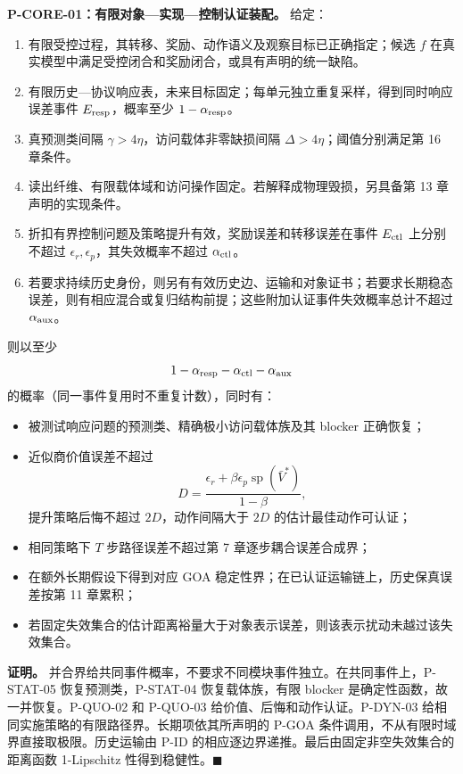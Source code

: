 \documentclass[
  11pt,
  oneside]{book}
\providecommand{\tightlist}{%
  \setlength{\itemsep}{0pt}\setlength{\parskip}{0pt}}
\begin{document}
\textbf{P-CORE-01：有限对象---实现---控制认证装配。} 给定：

\begin{enumerate}
\def\labelenumi{\arabic{enumi}.}
\tightlist
\item
  有限受控过程，其转移、奖励、动作语义及观察目标已正确指定；候选 \(f\) 在真实模型中满足受控闭合和奖励闭合，或具有声明的统一缺陷。
\item
  有限历史---协议响应表，未来目标固定；每单元独立重复采样，得到同时响应误差事件 \(E_{\rm resp}\)，概率至少 \(1-\alpha_{\rm resp}\)。
\item
  真预测类间隔 \(\gamma>4\eta\)，访问载体非零缺损间隔 \(\Delta>4\eta\)；阈值分别满足第 16 章条件。
\item
  读出纤维、有限载体域和访问操作固定。若解释成物理毁损，另具备第 13 章声明的实现条件。
\item
  折扣有界控制问题及策略提升有效，奖励误差和转移误差在事件 \(E_{\rm ctl}\) 上分别不超过 \(\epsilon_r,\epsilon_p\)，其失效概率不超过 \(\alpha_{\rm ctl}\)。
\item
  若要求持续历史身份，则另有有效历史边、运输和对象证书；若要求长期稳态误差，则有相应混合或复归结构前提；这些附加认证事件失效概率总计不超过 \(\alpha_{\rm aux}\)。
\end{enumerate}

则以至少 \[1-\alpha_{\rm resp}-\alpha_{\rm ctl}-\alpha_{\rm aux}\] 的概率（同一事件复用时不重复计数），同时有：

\begin{itemize}
\tightlist
\item
  被测试响应问题的预测类、精确极小访问载体族及其 blocker 正确恢复；
\item
  近似商价值误差不超过 \[D=\frac{\epsilon_r+\beta\epsilon_p\operatorname{sp}(\bar V^*)}{1-\beta},\] 提升策略后悔不超过 \(2D\)，动作间隔大于 \(2D\) 的估计最佳动作可认证；
\item
  相同策略下 \(T\) 步路径误差不超过第 7 章逐步耦合误差合成界；
\item
  在额外长期假设下得到对应 GOA 稳定性界；在已认证运输链上，历史保真误差按第 11 章累积；
\item
  若固定失效集合的估计距离裕量大于对象表示误差，则该表示扰动未越过该失效集合。
\end{itemize}

\textbf{证明。} 并合界给共同事件概率，不要求不同模块事件独立。在共同事件上，P-STAT-05 恢复预测类，P-STAT-04 恢复载体族，有限 blocker 是确定性函数，故一并恢复。P-QUO-02 和 P-QUO-03 给价值、后悔和动作认证。P-DYN-03 给相同实施策略的有限路径界。长期项依其所声明的 P-GOA 条件调用，不从有限时域界直接取极限。历史运输由 P-ID 的相应逐边界递推。最后由固定非空失效集合的距离函数 1-Lipschitz 性得到稳健性。\(\blacksquare\)
\end{document}
